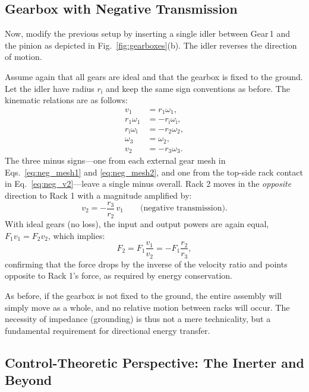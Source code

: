 \documentclass[reprint,aps,pra,superscriptaddress,longbibliography]{revtex4-2}
\begin{document}
\subsection{Gearbox with Negative Transmission}

Now, modify the previous setup by inserting a single idler between Gear\,1 and the pinion as depicted in Fig.~\ref{fig:gearboxes}(b). The idler reverses the direction of motion.

Assume again that all gears are ideal and that the gearbox is fixed to the ground. Let the idler have radius $r_\mathrm{i}$ and keep the same sign conventions as before. The kinematic relations are as follows:
\begin{align}
    v_1 &= r_1 \omega_1 ,
           \label{eq:neg_v1}\\
    r_1 \omega_1 &= -r_\mathrm{i} \omega_\mathrm{i} ,
           \label{eq:neg_mesh1}\\
    r_\mathrm{i} \omega_\mathrm{i} &= -r_2 \omega_2 ,
           \label{eq:neg_mesh2}\\
    \omega_3 &= \omega_2 ,
           \label{eq:neg_rigid}\\
    v_2 &= -r_3 \omega_3 .
           \label{eq:neg_v2}
\end{align}
The three minus signs---one from each external gear mesh in Eqs.~\eqref{eq:neg_mesh1} and \eqref{eq:neg_mesh2}, and one from the top-side rack contact in Eq.~\eqref{eq:neg_v2}---leave a single minus overall. Rack 2 moves in the \emph{opposite} direction to Rack 1 with a magnitude amplified by:
\begin{equation}
   v_2 = -\frac{r_3}{r_2}\,v_1 \qquad \text{(negative transmission).}
\end{equation}
With ideal gears (no loss), the input and output powers are again equal, $F_1 v_1 = F_2 v_2$, which implies:
\begin{equation}
     F_2 = F_1 \frac{v_1}{v_2} = - F_1 \frac{r_2}{r_3},
\end{equation}
confirming that the force drops by the inverse of the velocity ratio and points opposite to Rack 1's force, as required by energy conservation.

As before, if the gearbox is not fixed to the ground, the entire assembly will simply move as a whole, and no relative motion between racks will occur. The necessity of impedance (grounding) is thus not a mere technicality, but a fundamental requirement for directional energy transfer.

\subsection{Control-Theoretic Perspective: The Inerter and Beyond}
\end{document}

